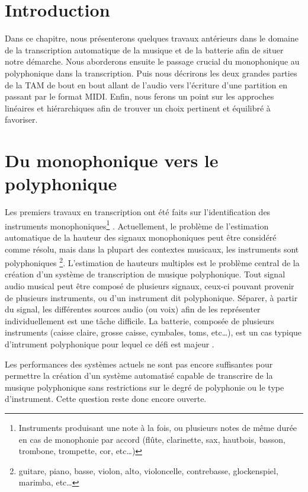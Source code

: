 \section*{Introduction}
Dans ce chapitre, nous présenterons quelques travaux antérieurs dans le domaine
de la transcription automatique de la musique et de la batterie afin de situer
notre démarche. Nous aborderons ensuite le passage crucial du monophonique au
polyphonique dans la transcription. Puis nous décrirons les deux grandes
parties de la TAM de bout en bout allant de l’audio vers l’écriture d’une
partition en passant par le format MIDI. Enfin, nous ferons un point sur les
approches linéaires et hiérarchiques afin de trouver un choix pertinent et
équilibré à favoriser.

\section{Du monophonique vers le polyphonique}
Les premiers travaux en transcription ont été faits sur l’identification des
instruments monophoniques\footnote{Instruments produisant une note à la fois,
ou plusieurs notes de même durée en cas de monophonie par accord (flûte,
clarinette, sax, hautbois, basson, trombone, trompette, cor, etc…)}
\cite{future_directions}. Actuellement, le problème de l'estimation automatique
de la hauteur des signaux monophoniques peut être considéré comme résolu, mais
dans la plupart des contextes musicaux, les instruments sont polyphoniques
\footnote{guitare, piano, basse, violon, alto, violoncelle, contrebasse,
glockenspiel, marimba, etc…}. L'estimation de hauteurs multiples est le
problème central de la création d'un système de transcription de musique
polyphonique. Tout signal audio musical peut être composé de plusieurs signaux,
ceux-ci pouvant provenir de plusieurs instruments, ou d'un instrument dit
polyphonique. Séparer, à partir du signal, les différentes sources audio (ou
voix) afin de les représenter individuellement est une tâche difficile. La
batterie, composée de plusieurs instruments (caisse claire, grosse caisse,
cymbales, toms, etc…), est un cas typique d'intrument polyphonique pour lequel
ce défi est majeur .

Les performances des systèmes actuels ne sont pas encore suffisantes pour
permettre la création d'un système automatisé capable de transcrire de la
musique polyphonique sans restrictions sur le degré de polyphonie ou le type
d'instrument. Cette question reste donc encore ouverte.

